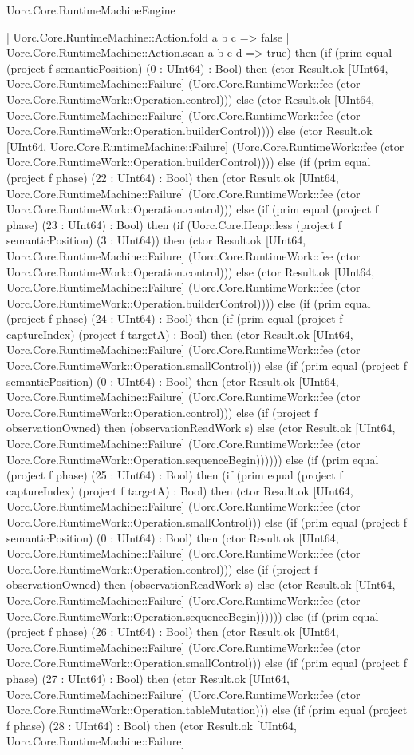 \begin{lexlean}{Uorc.Core.RuntimeMachineEngine}
\begin{semanticmodule}
{      | Uorc.Core.RuntimeMachine::Action.fold a b c => false
      | Uorc.Core.RuntimeMachine::Action.scan a b c d => true) then (if (prim equal (project f semanticPosition) (0 : UInt64) : Bool) then (ctor Result.ok [UInt64, Uorc.Core.RuntimeMachine::Failure] (Uorc.Core.RuntimeWork::fee (ctor Uorc.Core.RuntimeWork::Operation.control))) else (ctor Result.ok [UInt64, Uorc.Core.RuntimeMachine::Failure] (Uorc.Core.RuntimeWork::fee (ctor Uorc.Core.RuntimeWork::Operation.builderControl)))) else (ctor Result.ok [UInt64, Uorc.Core.RuntimeMachine::Failure] (Uorc.Core.RuntimeWork::fee (ctor Uorc.Core.RuntimeWork::Operation.builderControl)))) else (if (prim equal (project f phase) (22 : UInt64) : Bool) then (ctor Result.ok [UInt64, Uorc.Core.RuntimeMachine::Failure] (Uorc.Core.RuntimeWork::fee (ctor Uorc.Core.RuntimeWork::Operation.control))) else (if (prim equal (project f phase) (23 : UInt64) : Bool) then (if (Uorc.Core.Heap::less (project f semanticPosition) (3 : UInt64)) then (ctor Result.ok [UInt64, Uorc.Core.RuntimeMachine::Failure] (Uorc.Core.RuntimeWork::fee (ctor Uorc.Core.RuntimeWork::Operation.control))) else (ctor Result.ok [UInt64, Uorc.Core.RuntimeMachine::Failure] (Uorc.Core.RuntimeWork::fee (ctor Uorc.Core.RuntimeWork::Operation.builderControl)))) else (if (prim equal (project f phase) (24 : UInt64) : Bool) then (if (prim equal (project f captureIndex) (project f targetA) : Bool) then (ctor Result.ok [UInt64, Uorc.Core.RuntimeMachine::Failure] (Uorc.Core.RuntimeWork::fee (ctor Uorc.Core.RuntimeWork::Operation.smallControl))) else (if (prim equal (project f semanticPosition) (0 : UInt64) : Bool) then (ctor Result.ok [UInt64, Uorc.Core.RuntimeMachine::Failure] (Uorc.Core.RuntimeWork::fee (ctor Uorc.Core.RuntimeWork::Operation.control))) else (if (project f observationOwned) then (observationReadWork s) else (ctor Result.ok [UInt64, Uorc.Core.RuntimeMachine::Failure] (Uorc.Core.RuntimeWork::fee (ctor Uorc.Core.RuntimeWork::Operation.sequenceBegin)))))) else (if (prim equal (project f phase) (25 : UInt64) : Bool) then (if (prim equal (project f captureIndex) (project f targetA) : Bool) then (ctor Result.ok [UInt64, Uorc.Core.RuntimeMachine::Failure] (Uorc.Core.RuntimeWork::fee (ctor Uorc.Core.RuntimeWork::Operation.smallControl))) else (if (prim equal (project f semanticPosition) (0 : UInt64) : Bool) then (ctor Result.ok [UInt64, Uorc.Core.RuntimeMachine::Failure] (Uorc.Core.RuntimeWork::fee (ctor Uorc.Core.RuntimeWork::Operation.control))) else (if (project f observationOwned) then (observationReadWork s) else (ctor Result.ok [UInt64, Uorc.Core.RuntimeMachine::Failure] (Uorc.Core.RuntimeWork::fee (ctor Uorc.Core.RuntimeWork::Operation.sequenceBegin)))))) else (if (prim equal (project f phase) (26 : UInt64) : Bool) then (ctor Result.ok [UInt64, Uorc.Core.RuntimeMachine::Failure] (Uorc.Core.RuntimeWork::fee (ctor Uorc.Core.RuntimeWork::Operation.smallControl))) else (if (prim equal (project f phase) (27 : UInt64) : Bool) then (ctor Result.ok [UInt64, Uorc.Core.RuntimeMachine::Failure] (Uorc.Core.RuntimeWork::fee (ctor Uorc.Core.RuntimeWork::Operation.tableMutation))) else (if (prim equal (project f phase) (28 : UInt64) : Bool) then (ctor Result.ok [UInt64, Uorc.Core.RuntimeMachine::Failure] }
\end{semanticmodule}
\end{lexlean}
